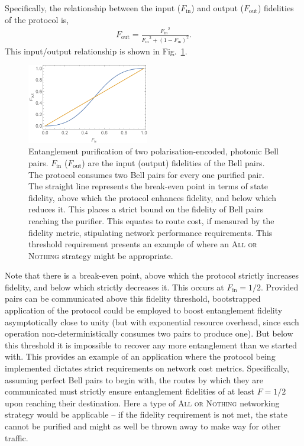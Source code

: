 Specifically, the relationship between the input ($F_\mathrm{in}$) and output ($F_\mathrm{out}$) fidelities of the protocol is,
\begin{align}
F_\mathrm{out} = \frac{{F_\mathrm{in}}^2}{{F_\mathrm{in}}^2 + (1-F_\mathrm{in})^2}.
\end{align}
This input/output relationship is shown in Fig.~\ref{fig:ent_purif}.

\begin{figure}[!htbp]
\includegraphics[width=0.475\textwidth]{ent_purif}
\caption{Entanglement purification of two polarisation-encoded, photonic Bell pairs. $F_\mathrm{in}$ ($F_\mathrm{out}$) are the input (output) fidelities of the Bell pairs. The protocol consumes two Bell pairs for every one purified pair. The straight line represents the break-even point in terms of state fidelity, above which the protocol enhances fidelity, and below which reduces it. This places a strict bound on the fidelity of Bell pairs reaching the purifier. This equates to route cost, if measured by the fidelity metric, stipulating network performance requirements. This threshold requirement presents an example of where an \textsc{All or Nothing} strategy might be appropriate.} \label{fig:ent_purif}
\end{figure}

Note that there is a break-even point, above which the protocol strictly increases fidelity, and below which strictly decreases it. This occurs at \mbox{$F_\mathrm{in}=1/2$}. Provided pairs can be communicated above this fidelity threshold, bootstrapped application of the protocol could be employed to boost entanglement fidelity asymptotically close to unity (but with exponential resource overhead, since each operation non-deterministically consumes two pairs to produce one). But below this threshold it is impossible to recover any more entanglement than we started with. This provides an example of an application where the protocol being implemented dictates strict requirements on network cost metrics. Specifically, assuming perfect Bell pairs to begin with, the routes by which they are communicated must strictly ensure entanglement fidelities of at least \mbox{$F=1/2$} upon reaching their destination. Here a type of \textsc{All or Nothing} networking strategy would be applicable -- if the fidelity requirement is not met, the state cannot be purified and might as well be thrown away to make way for other traffic.

